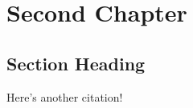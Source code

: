 \documentclass[11pt,oneside]{book}
\begin{document}

\chapter{Second Chapter}

\begin{bibunit}
\section{Section Heading}
Here's another citation! \citep{lshort}

\putbib
\end{bibunit}


\backmatter

\begin{bibunit}
\nocite{lim:etal:kdtei:2016,markdown:overleaf}   %

\renewcommand{\bibsection}{%
  \chapter*{List of Publications}
  \addcontentsline{toc}{chapter}{List of Publications}
}
\putbib
\end{bibunit}
\end{document}
